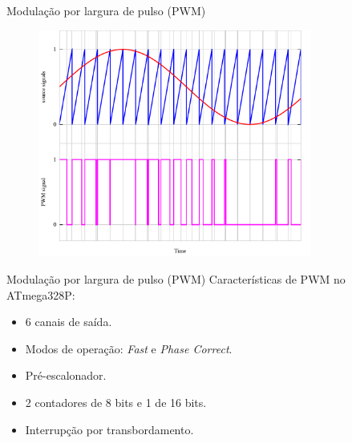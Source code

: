 \begin{frame}{Modulação por largura de pulso (PWM)}
\begin{figure}
\includegraphics[width=0.8\textwidth]{./img/Pwm.pdf}
\end{figure}
\end{frame}

\begin{frame}{Modulação por largura de pulso (PWM)}
Características de PWM no ATmega328P:
\begin{itemize}
  \item 6 canais de saída.
  \item Modos de operação: \emph{Fast} e \emph{Phase Correct}.
  \item Pré-escalonador.
  \item 2 contadores de 8 bits e 1 de 16 bits.
  \item Interrupção por transbordamento.
\end{itemize}
\end{frame}

